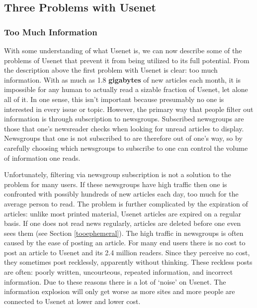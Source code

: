 \subsection{Three Problems with Usenet}

\subsubsection{Too Much Information}

With some understanding of what Usenet is, we can now describe some of the
problems of Usenet that prevent it from being utilized to its full
potential. From the description above the first problem with Usenet is
clear: too much information. With as much as 1.8 {\bf gigabytes} of new
articles each month, it is impossible for any human to actually read a
sizable fraction of Usenet, let alone all of it. In one sense, this isn't
important because presumably no one is interested in every issue or topic.
However, the primary way that people filter out information is through
subscription to newsgroups. Subscribed newsgroups are those that one's
newsreader checks when looking for unread articles to
display. Newsgroups that one is not subscribed to are
therefore out of one's way, so by carefully choosing which newsgroups to
subscribe to one can control the volume of information one reads.

Unfortunately, filtering via newsgroup subscription is not a solution to the
problem for many users. If these newsgroups have high traffic then one is
confronted with possibly hundreds of new articles each day, too much for the
average person to read. The problem is further complicated by the expiration
of articles: unlike most printed material, Usenet articles are expired on a
regular basis. If one does not read news regularly, articles are deleted
before one even sees them (see Section \ref{tooephemeral}). The high traffic
in newsgroups is often caused by the ease of posting an article. For many
end users there is no cost to post an article to Usenet and its 2.4 million
readers. Since they perceive no cost, they sometimes post recklessly,
apparently without thinking. These reckless posts are often: poorly written,
uncourteous, repeated information, and incorrect information. Due to these
reasons there is a lot of `noise' on Usenet. The information explosion
will only get worse as more sites and more people are connected to
Usenet at lower and lower cost.

